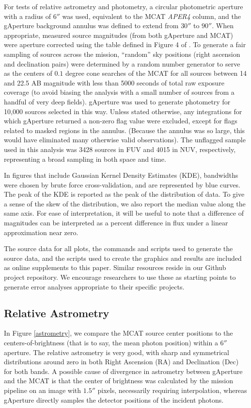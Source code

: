 \documentclass[preprint]{aastex}
\begin{document}
For tests of relative astrometry and photometry, a circular photometric aperture with a radius of $6''$ was used, equivalent to the MCAT \emph{APER4} column, and the gAperture background annulus was defined to extend from $30''$ to $90''$. When appropriate, measured source magnitudes (from both gAperture and MCAT) were aperture corrected using the table defined in Figure 4 of \cite{mor2007}. To generate a fair sampling of sources across the mission, ``random''  sky positions (right ascension and declination pairs) were determined by a random number generator to serve as the centers of $0.1$ degree cone searches of the MCAT for all sources between 14 and 22.5 AB magnitude with less than 5000 seconds of total raw exposure coverage (to avoid biasing the analysis with a small number of sources from a handful of very deep fields). gAperture was used to generate photometry for 10,000 sources selected in this way. Unless stated otherwise, any integrations for which gAperture returned a non-zero flag value were excluded, except for flags related to masked regions in the annulus. (Because the annulus was so large, this would have eliminated many otherwise valid observations). The unflagged sample used in this analysis was 3428 sources in FUV and 4015 in NUV, respectively, representing a broad sampling in both space and time.

In figures that include Gaussian Kernel Density Estimates (KDE), bandwidths were chosen by brute force cross-validation, and are represented by blue curves. The peak of the KDE is reported as the peak of the distribution of data. To give a sense of the skew of the distribution, we also report the median value along the same axis. For ease of interpretation, it will be useful to note that a difference of magnitudes can be interpreted as a percent difference in flux under a linear approximation near zero.

The source data for all plots, the commands and scripts used to generate the source data, and the scripts used to create the graphics and results are included as online supplements to this paper. Similar resources reside in our Github project repository. We encourage researchers to use these as starting points to generate error analyses appropriate to their specific projects.

\subsection{Relative Astrometry}
In Figure \ref{astrometry}, we compare the MCAT source center positions to the centers-of-brightness (that is to say, the mean photon position) within a $6''$ aperture. The relative astrometry is very good, with sharp and symmetrical distributions around zero in both Right Ascension (RA) and Declination (Dec) for both bands. A possible cause of divergence in astrometry between gAperture and the MCAT is that the center of brightness was calculated by the mission pipeline on an image with $1.5''$ pixels, necessarily requiring interpolation, whereas gAperture directly samples the detector positions of the incident photons.
\end{document}
